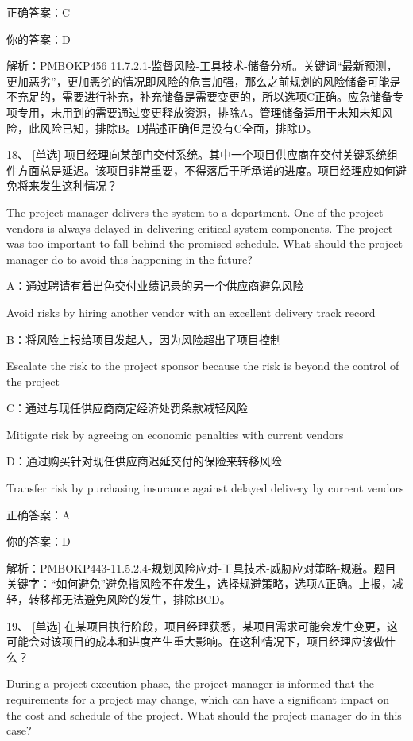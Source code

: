 正确答案：C

你的答案：D

解析：PMBOKP456 11.7.2.1-监督风险-工具技术-储备分析。关键词“最新预测，更加恶劣”，更加恶劣的情况即风险的危害加强，那么之前规划的风险储备可能是不充足的，需要进行补充，补充储备是需要变更的，所以选项C正确。应急储备专项专用，未用到的需要通过变更释放资源，排除A。管理储备适用于未知未知风险，此风险已知，排除B。D描述正确但是没有C全面，排除D。


18、 [单选] 项目经理向某部门交付系统。其中一个项目供应商在交付关键系统组件方面总是延迟。该项目非常重要，不得落后于所承诺的进度。项目经理应如何避免将来发生这种情况？

The project manager delivers the system to a department. One of the project vendors is always delayed in delivering critical system components. The project was too important to fall behind the promised schedule. What should the project manager do to avoid this happening in the future?

A：通过聘请有着出色交付业绩记录的另一个供应商避免风险

Avoid risks by hiring another vendor with an excellent delivery track record

B：将风险上报给项目发起人，因为风险超出了项目控制

Escalate the risk to the project sponsor because the risk is beyond the control of the project

C：通过与现任供应商商定经济处罚条款减轻风险

Mitigate risk by agreeing on economic penalties with current vendors

D：通过购买针对现任供应商迟延交付的保险来转移风险

Transfer risk by purchasing insurance against delayed delivery by current vendors

正确答案：A

你的答案：D

解析：PMBOKP443-11.5.2.4-规划风险应对-工具技术-威胁应对策略-规避。题目关键字：“如何避免”避免指风险不在发生，选择规避策略，选项A正确。上报，减轻，转移都无法避免风险的发生，排除BCD。

19、 [单选] 在某项目执行阶段，项目经理获悉，某项目需求可能会发生变更，这可能会对该项目的成本和进度产生重大影响。在这种情况下，项目经理应该做什么？

During a project execution phase, the project manager is informed that the requirements for a project may change, which can have a significant impact on the cost and schedule of the project. What should the project manager do in this case?

